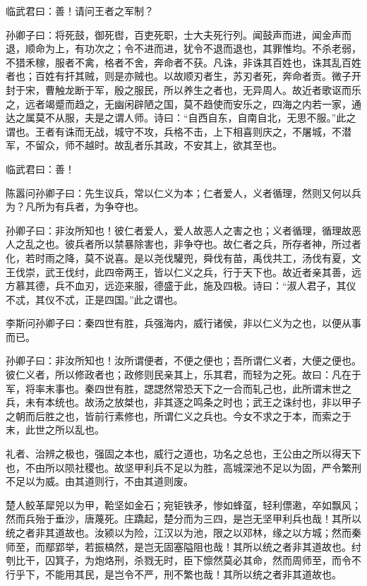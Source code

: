 \documentclass[]{article}
\begin{document}
临武君曰：善！请问王者之军制？

孙卿子曰：将死鼓，御死辔，百吏死职，士大夫死行列。闻鼓声而进，闻金声而退，顺命为上，有功次之；令不进而进，犹令不退而退也，其罪惟均。不杀老弱，不猎禾稼，服者不禽，格者不舍，奔命者不获。凡诛，非诛其百姓也，诛其乱百姓者也；百姓有扞其贼，则是亦贼也。以故顺刃者生，苏刃者死，奔命者贡。微子开封于宋，曹触龙断于军，殷之服民，所以养生之者也，无异周人。故近者歌讴而乐之，远者竭蹙而趋之，无幽闲辟陋之国，莫不趋使而安乐之，四海之内若一家，通达之属莫不从服，夫是之谓人师。诗曰：``自西自东，自南自北，无思不服。''此之谓也。王者有诛而无战，城守不攻，兵格不击，上下相喜则庆之，不屠城，不潜军，不留众，师不越时。故乱者乐其政，不安其上，欲其至也。

临武君曰：善！

陈嚣问孙卿子曰：先生议兵，常以仁义为本；仁者爱人，义者循理，然则又何以兵为？凡所为有兵者，为争夺也。

孙卿子曰：非汝所知也！彼仁者爱人，爱人故恶人之害之也；义者循理，循理故恶人之乱之也。彼兵者所以禁暴除害也，非争夺也。故仁者之兵，所存者神，所过者化，若时雨之降，莫不说喜。是以尧伐驩兜，舜伐有苗，禹伐共工，汤伐有夏，文王伐崇，武王伐纣，此四帝两王，皆以仁义之兵，行于天下也。故近者亲其善，远方慕其德，兵不血刃，远迩来服，德盛于此，施及四极。诗曰：``淑人君子，其仪不忒，其仪不忒，正是四国。''此之谓也。

李斯问孙卿子曰：秦四世有胜，兵强海内，威行诸侯，非以仁义为之也，以便从事而已。

孙卿子曰：非汝所知也！汝所谓便者，不便之便也；吾所谓仁义者，大便之便也。彼仁义者，所以修政者也；政修则民亲其上，乐其君，而轻为之死。故曰：凡在于军，将率末事也。秦四世有胜，諰諰然常恐天下之一合而轧己也，此所谓末世之兵，未有本统也。故汤之放桀也，非其逐之鸣条之时也；武王之诛纣也，非以甲子之朝而后胜之也，皆前行素修也，所谓仁义之兵也。今女不求之于本，而索之于末，此世之所以乱也。

礼者、治辨之极也，强固之本也，威行之道也，功名之总也，王公由之所以得天下也，不由所以陨社稷也。故坚甲利兵不足以为胜，高城深池不足以为固，严令繁刑不足以为威。由其道则行，不由其道则废。

楚人鲛革犀兕以为甲，鞈坚如金石；宛钜铁矛，惨如蜂虿，轻利僄遫，卒如飘风；然而兵殆于垂沙，唐蔑死。庄蹻起，楚分而为三四，是岂无坚甲利兵也哉！其所以统之者非其道故也。汝颍以为险，江汉以为池，限之以邓林，缘之以方城；然而秦师至，而鄢郢举，若振槁然，是岂无固塞隘阻也哉！其所以统之者非其道故也。纣刳比干，囚箕子，为炮烙刑，杀戮无时，臣下懔然莫必其命，然而周师至，而令不行乎下，不能用其民，是岂令不严，刑不繁也哉！其所以统之者非其道故也。
\end{document}
